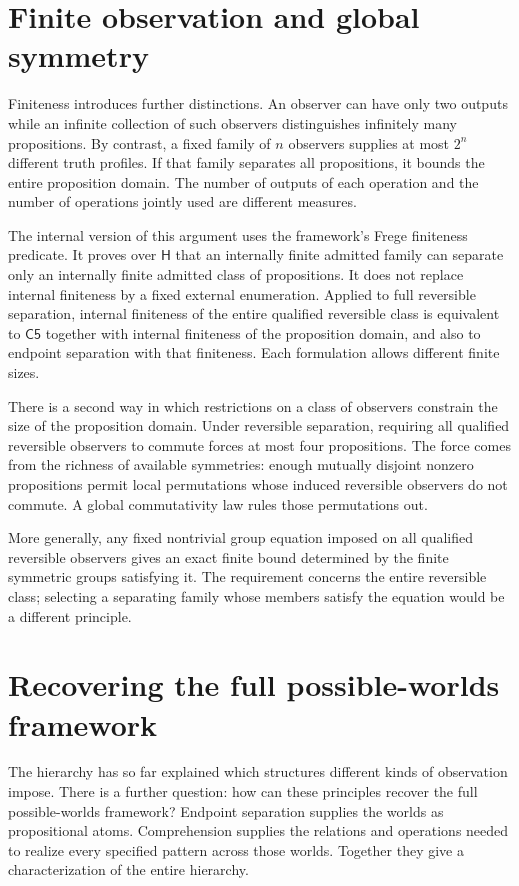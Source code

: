 \documentclass[12pt,letterpaper]{article}
\newcommand{\Hlogic}{\mathsf{H}}
\newcommand{\Cfive}{\mathsf{C5}}
\begin{document}
\section{Finite observation and global symmetry}

Finiteness introduces further distinctions. An observer can have only two outputs while an infinite collection of such observers distinguishes infinitely many propositions. By contrast, a fixed family of $n$ observers supplies at most $2^n$ different truth profiles. If that family separates all propositions, it bounds the entire proposition domain. The number of outputs of each operation and the number of operations jointly used are different measures.


The internal version of this argument uses the framework's Frege finiteness predicate. It proves over $\Hlogic$ that an internally finite admitted family can separate only an internally finite admitted class of propositions. It does not replace internal finiteness by a fixed external enumeration. Applied to full reversible separation, internal finiteness of the entire qualified reversible class is equivalent to $\Cfive$ together with internal finiteness of the proposition domain, and also to endpoint separation with that finiteness. Each formulation allows different finite sizes.~\cite{r11}


There is a second way in which restrictions on a class of observers constrain the size of the proposition domain. Under reversible separation, requiring all qualified reversible observers to commute forces at most four propositions. The force comes from the richness of available symmetries: enough mutually disjoint nonzero propositions permit local permutations whose induced reversible observers do not commute. A global commutativity law rules those permutations out.~\cite[\S\S3--5]{r12}


More generally, any fixed nontrivial group equation imposed on all qualified reversible observers gives an exact finite bound determined by the finite symmetric groups satisfying it. The requirement concerns the entire reversible class; selecting a separating family whose members satisfy the equation would be a different principle.


\section{Recovering the full possible-worlds framework}

The hierarchy has so far explained which structures different kinds of observation impose. There is a further question: how can these principles recover the full possible-worlds framework? Endpoint separation supplies the worlds as propositional atoms. Comprehension supplies the relations and operations needed to realize every specified pattern across those worlds. Together they give a characterization of the entire hierarchy.
\end{document}
